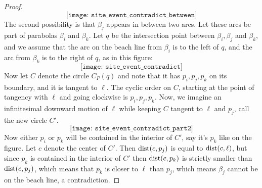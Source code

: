 \begin{proof}
\[
    \texttt{[image: site\_event\_contradict\_between]}
\]
The second possibility is that $\beta_j$ appears in between two arcs. Let these arcs be part of parabolas $\beta_i$ and $\beta_k$. Let $q$ be the intersection point between $\beta_i, \beta_j$ and $\beta_k$, and we assume that the arc on the beach line from $\beta_i$ is to the left of $q$, and the arc from $\beta_k$ is to the right of $q$, as in this figure:
\[
    \texttt{[image: site\_event\_contradict]} %
\]
Now let $C$ denote the circle $C_P(q)$ and note that it has $p_i, p_j, p_k$ on its boundary, and it is tangent to $\ell$. The cyclic order on $C$, starting at the point of tangency with $\ell$ and going clockwise is $p_i, p_j, p_k$. Now, we imagine an infinitesimal downward motion of $\ell$ while keeping $C$ tangent to $\ell$ and $p_j$, call the new circle $C'$.
\[
    \texttt{[image: site\_event\_contradict\_part2]}
\]
Now either $p_i$ or $p_k$ will be contained in the interior of $C'$, say it's $p_k$ like on the figure. Let $c$ denote the center of $C'$. Then $\operatorname{dist}(c, p_j)$ is equal to $\operatorname{dist}(c, \ell)$, but since $p_k$ is contained in the interior of $C'$ then $\operatorname{dist}(c, p_k)$ is strictly smaller than $\operatorname{dist}(c, p_j)$, which means that $p_k$ is closer to $\ell$ than $p_j$, which means $\beta_j$ cannot be on the beach line, a contradiction.
\end{proof}

